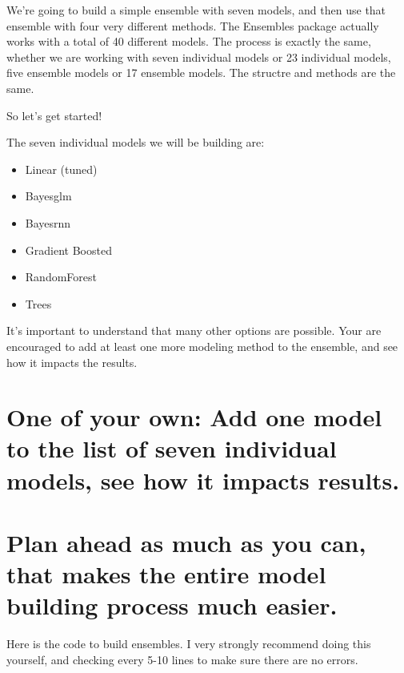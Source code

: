 \documentclass[
]{book}
\begin{document}
We're going to build a simple ensemble with seven models, and then use
that ensemble with four very different methods. The Ensembles package
actually works with a total of 40 different models. The process is
exactly the same, whether we are working with seven individual models or
23 individual models, five ensemble models or 17 ensemble models. The
structre and methods are the same.

So let's get started!

The seven individual models we will be building are:

\begin{itemize}
\item
  Linear (tuned)
\item
  Bayesglm
\item
  Bayesrnn
\item
  Gradient Boosted
\item
  RandomForest
\item
  Trees
\end{itemize}

It's important to understand that many other options are possible. Your
are encouraged to add at least one more modeling method to the ensemble,
and see how it impacts the results.

\section{One of your own: Add one model to the list of seven individual models, see how it impacts results.}\label{one-of-your-own-add-one-model-to-the-list-of-seven-individual-models-see-how-it-impacts-results.}

\section{Plan ahead as much as you can, that makes the entire model building process much easier.}\label{plan-ahead-as-much-as-you-can-that-makes-the-entire-model-building-process-much-easier.}

Here is the code to build ensembles. I very strongly recommend doing
this yourself, and checking every 5-10 lines to make sure there are no
errors.
\end{document}
